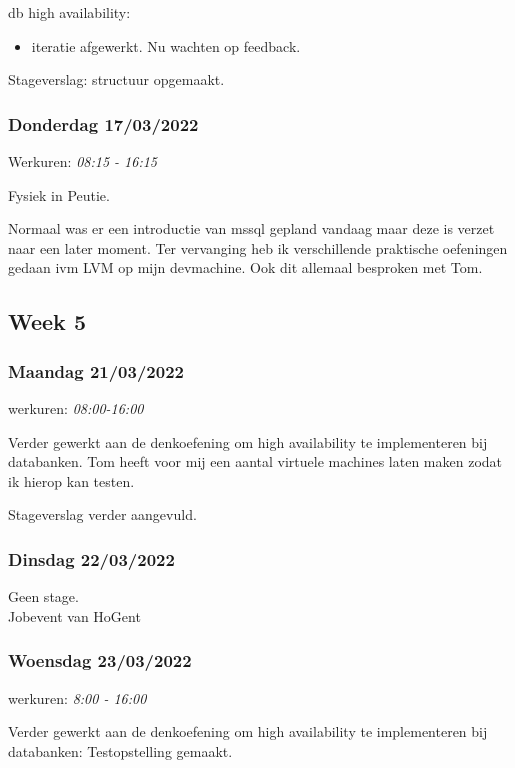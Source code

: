 db high availability:

\begin{itemize}
    \item iteratie afgewerkt. Nu wachten op feedback.
\end{itemize}

Stageverslag: structuur opgemaakt.

\subsubsection{Donderdag 17/03/2022}

Werkuren: \emph{08:15 - 16:15}

Fysiek in Peutie.

Normaal was er een introductie van mssql gepland vandaag maar deze is
verzet naar een later moment. Ter vervanging heb ik verschillende
praktische oefeningen gedaan ivm LVM op mijn devmachine. Ook dit
allemaal besproken met Tom.

\subsection{Week 5}

\subsubsection{Maandag 21/03/2022}

werkuren: \emph{08:00-16:00}

Verder gewerkt aan de denkoefening om high availability te implementeren
bij databanken. Tom heeft voor mij een aantal virtuele machines laten
maken zodat ik hierop kan testen.

Stageverslag verder aangevuld.

\subsubsection{Dinsdag 22/03/2022}

Geen stage.\\
Jobevent van HoGent


\subsubsection{Woensdag 23/03/2022}

werkuren: \emph{8:00 - 16:00}

Verder gewerkt aan de denkoefening om high availability te implementeren
bij databanken: Testopstelling gemaakt.

